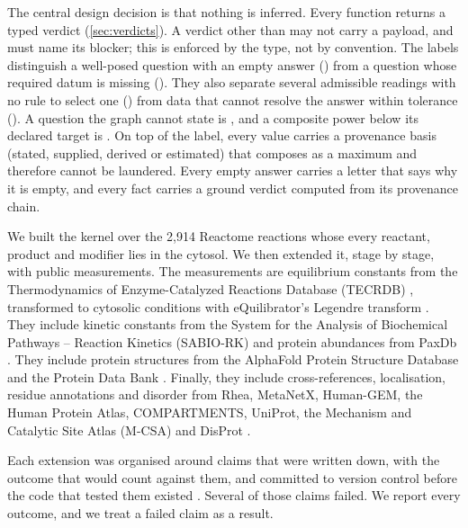 The central design decision is that nothing is inferred.
Every function returns a typed verdict (\cref{sec:verdicts}).
A verdict other than  may not carry a payload, and must name its blocker; this is enforced by the type, not by convention.
The labels distinguish a well-posed question with an empty answer () from a question whose required datum is missing ().
They also separate several admissible readings with no rule to select one () from data that cannot resolve the answer within tolerance ().
A question the graph cannot state is , and a composite power below its declared target is .
On top of the label, every value carries a provenance basis (stated, supplied, derived or estimated) that composes as a maximum and therefore cannot be laundered.
Every empty answer carries a letter that says why it is empty, and every fact carries a ground verdict computed from its provenance chain.

We built the kernel over the 2{,}914 Reactome reactions whose every reactant, product and modifier lies in the cytosol.
We then extended it, stage by stage, with public measurements.
The measurements are equilibrium constants from the Thermodynamics of Enzyme-Catalyzed Reactions Database (TECRDB) \citep{goldberg2004tecrdb}, transformed to cytosolic conditions with eQuilibrator's Legendre transform \citep{alberty2003thermodynamics,beber2022equilibrator}.
They include kinetic constants from the System for the Analysis of Biochemical Pathways -- Reaction Kinetics (SABIO-RK) \citep{wittig2012sabio} and protein abundances from PaxDb \citep{wang2015paxdb}.
They include protein structures from the AlphaFold Protein Structure Database \citep{jumper2021alphafold,varadi2022afdb} and the Protein Data Bank \citep{berman2000pdb}.
Finally, they include cross-references, localisation, residue annotations and disorder from Rhea, MetaNetX, Human-GEM, the Human Protein Atlas, COMPARTMENTS, UniProt, the Mechanism and Catalytic Site Atlas (M-CSA) and DisProt \citep{bansal2022rhea,moretti2021metanetx,robinson2020humangem,thul2017hpa,binder2014compartments,uniprot2023,ribeiro2018mcsa,quaglia2022disprot}.

Each extension was organised around claims that were written down, with the outcome that would count against them, and committed to version control before the code that tested them existed \citep{nosek2018preregistration}.
Several of those claims failed.
We report every outcome, and we treat a failed claim as a result.

